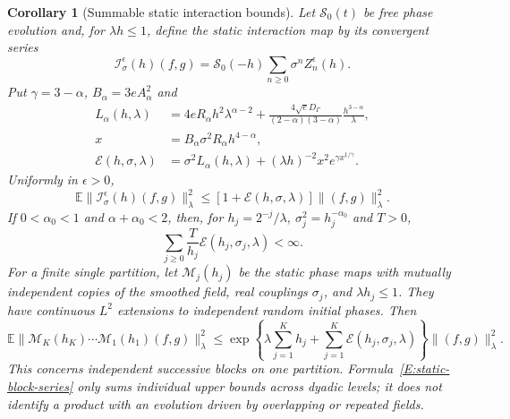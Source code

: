 \documentclass[12pt,oneside,openany]{book}
\makeatletter
\let\lean@pending\@empty
\newcommand{\LeanMarker}[1]{\gdef\lean@pending{#1}}
\numberwithin{equation}{section}
\newtheorem{corollary}[theorem]{Corollary}
\theoremstyle{nogostyle}
\theoremstyle{definition}
\newcommand{\E}{\mathbb{E}}
\makeatother
\begin{document}
\LeanMarker{C:static-interaction}
\begin{corollary}[Summable static interaction bounds]
  \label{C:static-interaction}
  Let $\mathcal{S}_0(t)$ be free phase evolution and, for $\lambda h \le 1$,
  define the static interaction map by its convergent series
  \[
    \mathcal{I}^\epsilon_\sigma(h)(f,g)
    =\mathcal{S}_0(-h)\sum_{n\ge0}\sigma^n Z_n^\epsilon(h).
  \]
  Put $\gamma = 3-\alpha$, $B_\alpha = 3eA_\alpha^2$ and
  \[
    \begin{split}
      L_\alpha(h,\lambda)
      &=4eR_\alpha h^2\lambda^{\alpha-2}
      +\frac{4\sqrt eD_\Gamma}{(2-\alpha)(3-\alpha)}
      \frac{h^{3-\alpha}}{\lambda},\\
      x&=B_\alpha\sigma^2R_\alpha h^{4-\alpha},\\
      \mathcal{E}(h,\sigma,\lambda)
      &=\sigma^2L_\alpha(h,\lambda)
      +(\lambda h)^{-2}x^2e^{\gamma x^{1/\gamma}}.
    \end{split}
  \]
  Uniformly in $\epsilon > 0$,
  \begin{equation}\label{E:static-interaction}
    \E\|\mathcal{I}^\epsilon_\sigma(h)(f,g)\|_\lambda^2
    \le[1+\mathcal{E}(h,\sigma,\lambda)]\|(f,g)\|_\lambda^2.
  \end{equation}
  If $0 < \alpha_0 < 1$ and $\alpha+\alpha_0 < 2$, then, for $h_j =
  2^{-j}/\lambda$, $\sigma_j^2 = h_j^{-\alpha_0}$ and $T > 0$,
  \begin{equation}\label{E:static-block-series}
    \sum_{j\ge0}\frac{T}{h_j}\mathcal{E}(h_j,\sigma_j,\lambda)<\infty.
  \end{equation}
  For a finite single partition, let $\mathcal{M}_j(h_j)$ be the static phase
  maps with mutually independent copies of the smoothed field, real couplings
  $\sigma_j$, and $\lambda h_j \le 1$. They have continuous $L^2$ extensions to
  independent random initial phases. Then
  \begin{equation}\label{E:independent-static-blocks}
    \E\|\mathcal{M}_K(h_K)\cdots\mathcal{M}_1(h_1)(f,g)\|_\lambda^2
    \le
    \exp\left\{\lambda\sum_{j=1}^K h_j+
    \sum_{j=1}^K\mathcal{E}(h_j,\sigma_j,\lambda)\right\}
    \|(f,g)\|_\lambda^2.
  \end{equation}
  This concerns independent successive blocks on one partition.
  Formula~\eqref{E:static-block-series} only sums individual upper bounds across
  dyadic levels; it does not identify a product with an evolution driven by
  overlapping or repeated fields.
\end{corollary}
\end{document}
